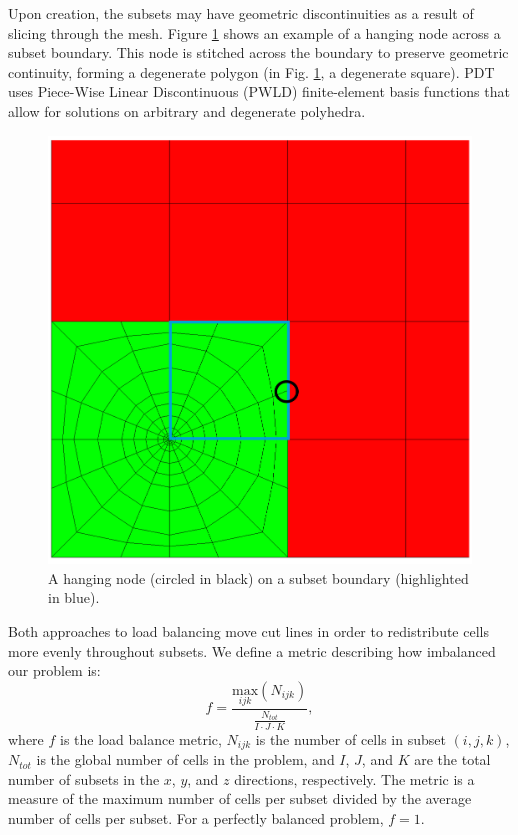 Upon creation, the subsets may have geometric discontinuities as a result of slicing through the mesh. 
Figure \ref{hanging_node} shows an example of a hanging node across a subset boundary. 
This node is stitched across the boundary to preserve geometric continuity, forming a degenerate polygon \cite{degenerate} (in Fig. \ref{hanging_node}, a degenerate square). 
PDT uses Piece-Wise Linear Discontinuous (PWLD) finite-element basis functions \cite{pwld_ragusa,pwld_teresa} that allow for solutions on arbitrary and degenerate polyhedra. 
\begin{figure}[H]
  \centering
  \includegraphics[scale=0.2]{../../figures/hanging_node_spiderweb_example.png}
   \caption{A hanging node (circled in black) on a subset boundary (highlighted in blue).}
   \label{hanging_node}
\end{figure}

Both approaches to load balancing move cut lines in order to redistribute cells more evenly throughout subsets. We define a metric describing how imbalanced our problem is:
\begin{equation}
f =\frac{\underset{ijk}{\text{max}}(N_{ijk})}{\frac{N_{tot}}{I\cdot J\cdot K}},
\label{metric_def}
\end{equation}
where $f$ is the load balance metric, $N_{ijk}$ is the number of cells in subset $(i,j,k)$, $N_{tot}$ is the global number of cells in the problem, and $I$, $J$, and $K$ are the total number of subsets in the $x$, $y$, and $z$ directions, respectively. The metric is a measure of the maximum number of cells per subset divided by the average number of cells per subset. For a perfectly balanced problem, $f = 1$.

